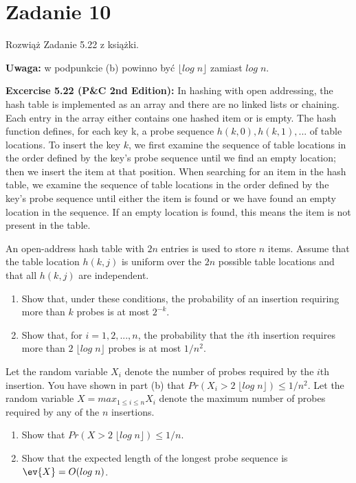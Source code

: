 \section{Zadanie 10}
Rozwiąż Zadanie 5.22 z książki.

\textbf{Uwaga:} w podpunkcie (b) powinno być \(\lfloor log\;n \rfloor\) zamiast \(log\;n\).

\textbf{Excercise 5.22 (P\&C 2nd Edition):}
In hashing with open addressing, the hash table is implemented as an array and there are no linked lists or chaining. Each entry in the array either contains one hashed item or is empty. The hash function defines, for each key k, a probe sequence \(h(k, 0), h(k, 1), ...\) of table locations. To insert the key \(k\), we first examine the sequence of table locations in the order defined by the key’s probe sequence until we find an empty location; then we insert the item at that position. When searching for an item in the hash table, we examine the sequence of table locations in the order defined by the key’s probe sequence until either the item is found or we have found an empty location in the sequence. If an empty location is found, this means the item is not present in the table.

An open-address hash table with \(2n\) entries is used to store \(n\) items. Assume that the table location \(h(k, j)\) is uniform over the \(2n\) possible table locations and that all \(h(k, j)\) are independent.

\begin{enumerate}[label=\textbf{(\alph*)}]
	\item Show that, under these conditions, the probability of an insertion requiring more than \(k\) probes is at most \(2^{-k}\).
	\item Show that, for \(i = 1, 2, ..., n\), the probability that the \(i\)th insertion requires more than \(2\;\lfloor log \;n \rfloor\) probes is at most \(1/n^2\).
\end{enumerate}

Let the random variable \(X_i\) denote the number of probes required by the \(i\)th insertion. You have shown in part (b) that \(Pr(X_i > 2\;\lfloor log \; n \rfloor) \le 1/n^2\). Let the random variable \(X = max_{1 \le i \le n} X_i\) denote the maximum number of probes required by any of the \(n\) insertions.

\begin{enumerate}[label=\textbf{(\alph*)}, start=3]
	\item Show that \(Pr(X > 2\;\lfloor log \; n \rfloor) \le 1/n\).
	\item Show that the expected length of the longest probe sequence is \(\ev{X} = O(log\;n)\).
\end{enumerate}

